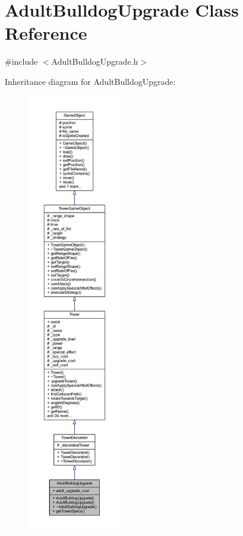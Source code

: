 \hypertarget{class_adult_bulldog_upgrade}{\section{Adult\+Bulldog\+Upgrade Class Reference}
\label{class_adult_bulldog_upgrade}
}


{\ttfamily \#include $<$Adult\+Bulldog\+Upgrade.\+h$>$}



Inheritance diagram for Adult\+Bulldog\+Upgrade\+:
\nopagebreak
\begin{figure}[H]
\begin{center}
\leavevmode
\includegraphics[height=550pt]{class_adult_bulldog_upgrade__inherit__graph}
\end{center}
\end{figure}


